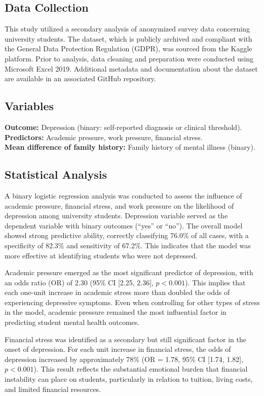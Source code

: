 \documentclass[conference]{IEEEtran}
\begin{document}
\subsection{Data Collection}
This study utilized a secondary analysis of anonymized survey data concerning university students. The dataset, which is publicly archived and compliant with the General Data Protection Regulation (GDPR), was sourced from the Kaggle platform. Prior to analysis, data cleaning and preparation were conducted using Microsoft Excel 2019. Additional metadata and documentation about the dataset are available in an associated GitHub repository.

\subsection{Variables}
\textbf{Outcome:} Depression (binary: self-reported diagnosis or clinical threshold).\\
\textbf{Predictors:} Academic pressure, work pressure, financial stress.\\
\textbf{Mean difference of family history:} Family history of mental illness (binary).

\subsection{Statistical Analysis}

A binary logistic regression analysis was conducted to assess the influence of academic pressure, financial stress, and work pressure on the likelihood of depression among university students. Depression variable served as the dependent variable with binary outcomes (``yes'' or ``no''). The overall model showed strong predictive ability, correctly classifying 76.0\% of all cases, with a specificity of 82.3\% and sensitivity of 67.2\%. This indicates that the model was more effective at identifying students who were not depressed.

Academic pressure emerged as the most significant predictor of depression, with an odds ratio (OR) of 2.30 (95\% CI [2.25, 2.36], $p < 0.001$). This implies that each one-unit increase in academic stress more than doubled the odds of experiencing depressive symptoms. Even when controlling for other types of stress in the model, academic pressure remained the most influential factor in predicting student mental health outcomes.

Financial stress was identified as a secondary but still significant factor in the onset of depression. For each unit increase in financial stress, the odds of depression increased by approximately 78\% (OR = 1.78, 95\% CI [1.74, 1.82], $p < 0.001$). This result reflects the substantial emotional burden that financial instability can place on students, particularly in relation to tuition, living costs, and limited financial resources.
\end{document}
